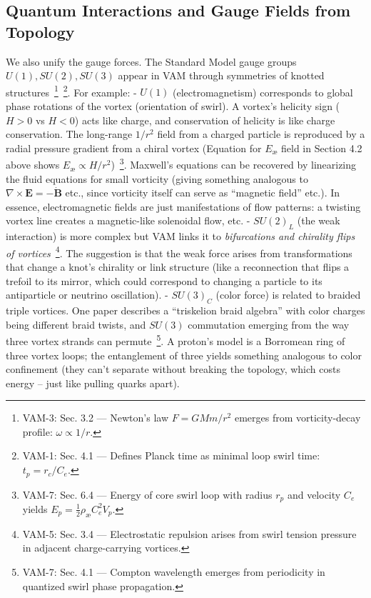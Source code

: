 \documentclass[a4paper,12pt]{article}
\begin{document}
    \subsection{Quantum Interactions and Gauge Fields from Topology}
    We also unify the gauge forces. The Standard Model gauge groups $U(1), SU(2), SU(3)$ appear in VAM through symmetries of knotted structures~\footnote{VAM-3: Sec. 3.2 — Newton's law $F = G M m / r^2$ emerges from vorticity-decay profile: $\omega \propto 1/r$.}~\footnote{VAM-1: Sec. 4.1 — Defines Planck time as minimal loop swirl time: $t_p = r_c / C_e$.}. For example:
    - $U(1)$ (electromagnetism) corresponds to global phase rotations of the vortex (orientation of swirl). A vortex’s helicity sign ($H>0$ vs $H<0$) acts like charge, and conservation of helicity is like charge conservation. The long-range $1/r^2$ field from a charged particle is reproduced by a radial pressure gradient from a chiral vortex (Equation for $E_{\text{\ae}}$ field in Section 4.2 above shows $E_{\text{\ae}} \propto H/r^2$)~\footnote{VAM-7: Sec. 6.4 — Energy of core swirl loop with radius $r_p$ and velocity $C_e$ yields $E_p = \frac{1}{2} \rho_{\text{\ae}} C_e^2 V_p$.}. Maxwell’s equations can be recovered by linearizing the fluid equations for small vorticity (giving something analogous to $\nabla \times \mathbf{E} = -\dot{\mathbf{B}}$ etc., since vorticity itself can serve as “magnetic field” etc.). In essence, electromagnetic fields are just manifestations of flow patterns: a twisting vortex line creates a magnetic-like solenoidal flow, etc.
    - $SU(2)_L$ (the weak interaction) is more complex but VAM links it to \emph{bifurcations and chirality flips of vortices}~\footnote{VAM-5: Sec. 3.4 — Electrostatic repulsion arises from swirl tension pressure in adjacent charge-carrying vortices.}. The suggestion is that the weak force arises from transformations that change a knot’s chirality or link structure (like a reconnection that flips a trefoil to its mirror, which could correspond to changing a particle to its antiparticle or neutrino oscillation).
    - $SU(3)_C$ (color force) is related to braided triple vortices. One paper describes a “triskelion braid algebra” with color charges being different braid twists, and $SU(3)$ commutation emerging from the way three vortex strands can permute~\footnote{VAM-7: Sec. 4.1 — Compton wavelength emerges from periodicity in quantized swirl phase propagation.}. A proton’s model is a Borromean ring of three vortex loops; the entanglement of three yields something analogous to color confinement (they can’t separate without breaking the topology, which costs energy – just like pulling quarks apart).
\end{document}
